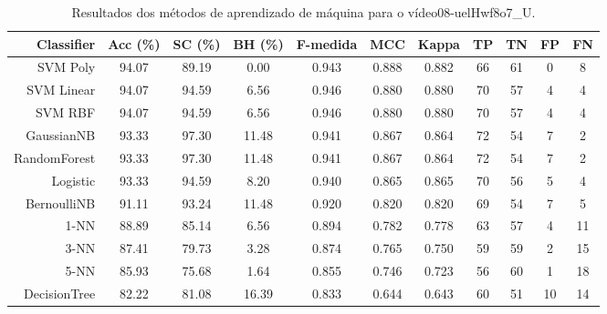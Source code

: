 \begin{table}[!htb]
\centering
\caption{Resultados dos métodos de aprendizado de máquina para o vídeo08-uelHwf8o7_U.}
\label{tab:08-uelHwf8o7_U}
\begin{tabular}{r|c|c|c|c|c|c|c|c|c|c}
\hline\hline
Classifier & Acc (\%) & SC (\%) & BH (\%) & F-medida & MCC & Kappa & TP & TN & FP & FN \\ \hline
SVM Poly & 94.07 & 89.19 & 0.00 & 0.943 & 0.888 & 0.882 & 66 & 61 & 0 & 8 \\ 
SVM Linear & 94.07 & 94.59 & 6.56 & 0.946 & 0.880 & 0.880 & 70 & 57 & 4 & 4 \\ 
SVM RBF & 94.07 & 94.59 & 6.56 & 0.946 & 0.880 & 0.880 & 70 & 57 & 4 & 4 \\ 
GaussianNB & 93.33 & 97.30 & 11.48 & 0.941 & 0.867 & 0.864 & 72 & 54 & 7 & 2 \\ 
RandomForest & 93.33 & 97.30 & 11.48 & 0.941 & 0.867 & 0.864 & 72 & 54 & 7 & 2 \\ 
Logistic & 93.33 & 94.59 & 8.20 & 0.940 & 0.865 & 0.865 & 70 & 56 & 5 & 4 \\ 
BernoulliNB & 91.11 & 93.24 & 11.48 & 0.920 & 0.820 & 0.820 & 69 & 54 & 7 & 5 \\ 
1-NN & 88.89 & 85.14 & 6.56 & 0.894 & 0.782 & 0.778 & 63 & 57 & 4 & 11 \\ 
3-NN & 87.41 & 79.73 & 3.28 & 0.874 & 0.765 & 0.750 & 59 & 59 & 2 & 15 \\ 
5-NN & 85.93 & 75.68 & 1.64 & 0.855 & 0.746 & 0.723 & 56 & 60 & 1 & 18 \\ 
DecisionTree & 82.22 & 81.08 & 16.39 & 0.833 & 0.644 & 0.643 & 60 & 51 & 10 & 14 \\ 
\hline\hline
\end{tabular}
\end{table}
